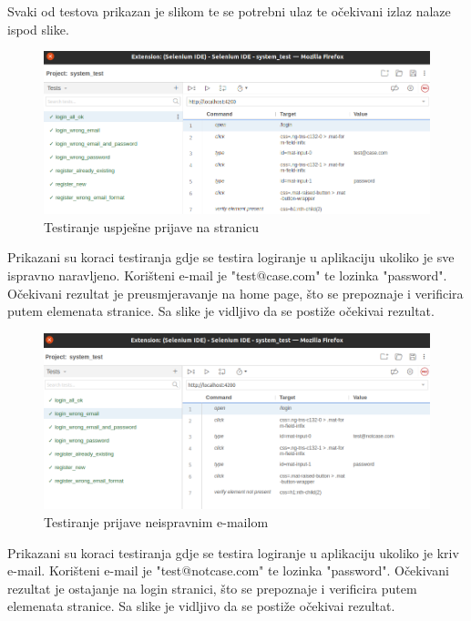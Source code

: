         Svaki od testova prikazan je slikom te se potrebni ulaz te očekivani izlaz nalaze ispod slike.
        
			\eject 

           \begin{figure}[H]
                \includegraphics[width=\textwidth]{slike/tests_system/login_all_ok.png} %
                \caption{Testiranje uspješne prijave na stranicu}
                \label{fig:struktura} %
            \end{figure}
            Prikazani su koraci testiranja gdje se testira logiranje u aplikaciju ukoliko je sve ispravno naravljeno. Korišteni e-mail je "test@case.com" te lozinka "password". Očekivani rezultat je preusmjeravanje na home page, što se prepoznaje i verificira putem elemenata stranice. Sa slike je vidljivo da se postiže očekivai rezultat.

            \begin{figure}[H]
                \includegraphics[width=\textwidth]{slike/tests_system/login_wrong_email.png} %
                \caption{Testiranje prijave neispravnim e-mailom}
                \label{fig:struktura} %
            \end{figure}
            Prikazani su koraci testiranja gdje se testira logiranje u aplikaciju ukoliko je kriv e-mail. Korišteni e-mail je "test@notcase.com" te lozinka "password". Očekivani rezultat je ostajanje na login stranici, što se prepoznaje i verificira putem elemenata stranice. Sa slike je vidljivo da se postiže očekivai rezultat.

